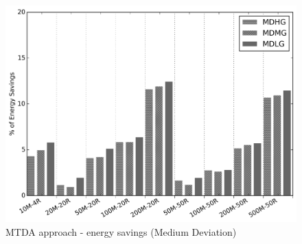 \begin{figure}
\centering
\includegraphics[width=0.9\linewidth]{figs/perc_energy_diff_temp_flex_def_vs_oarb_medium_mtd.png}	
\caption{MTDA approach - energy savings (Medium Deviation)}
\label{fig:atc_memr}
\end{figure}

